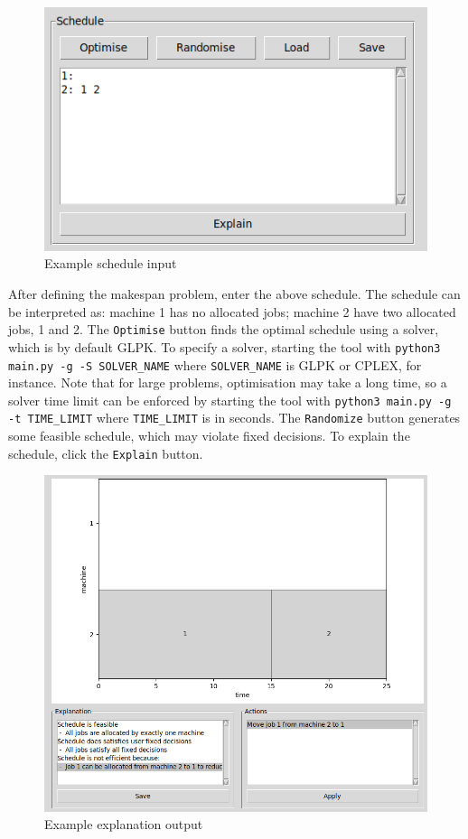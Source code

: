 \begin{figure}[H]
	\centering
	\includegraphics[scale=0.5]{figures/tool_schedule.png}
	\caption{Example schedule input}
\end{figure}

After defining the makespan problem, enter the above schedule. The schedule can be interpreted as: machine 1 has no allocated jobs; machine 2 have two allocated jobs, 1 and 2. The \texttt{Optimise} button finds the optimal schedule using a solver, which is by default GLPK. To specify a solver, starting the tool with \texttt{python3 main.py -g -S SOLVER\_NAME} where \texttt{SOLVER\_NAME} is GLPK or CPLEX, for instance. Note that for large problems, optimisation may take a long time, so a solver time limit can be enforced by starting the tool with \texttt{python3 main.py -g -t TIME\_LIMIT} where \texttt{TIME\_LIMIT} is in seconds. The \texttt{Randomize} button generates some feasible schedule, which may violate fixed decisions. To explain the schedule, click the \texttt{Explain} button. 

\begin{figure}[H]
	\centering
	\includegraphics[width=\linewidth]{figures/tool_explain.png}
	\caption{Example explanation output}
\end{figure}

